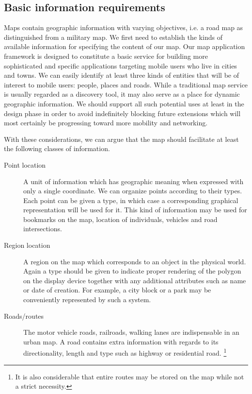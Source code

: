 \documentclass[a4paper,10pt]{article}
\begin{document}
\subsection{Basic information requirements}

Maps contain geographic information with varying objectives, i.e. a road map
as distinguished from a military map. We first need to establish the kinds
of available information for specifying the content of our map. Our map
application framework is designed to constitute a basic service for building
more sophisticated and specific applications targeting mobile users who live
in cities and towns. We can easily identify at least three kinds of entities
that will be of interest to mobile users: people, places and roads.  While a
traditional map service is usually regarded as a discovery tool, it may also
serve as a place for dynamic geographic information. We should support all
such potential uses at least in the design phase in order to avoid
indefinitely blocking future extensions which will most certainly be
progressing toward more mobility and networking.

With these considerations, we can argue that the map should facilitate at
least the following classes of information.

\begin{description}
\item[Point location] A unit of information which has geographic meaning
  when expressed with only a single coordinate. We can organize points
  according to their types. Each point can be given a type, in which case a
  corresponding graphical representation will be used for it. This kind of
  information may be used for bookmarks on the map, location of individuals,
  vehicles and road intersections.
\item[Region location] A region on the map which corresponds to an object in
  the physical world. Again a type should be given to indicate proper
  rendering of the polygon on the display device together with any
  additional attributes such as name or date of creation. For example, a
  city block or a park may be conveniently represented by such a system.
\item[Roads/routes] The motor vehicle roads, railroads, walking lanes are
  indispensable in an urban map. A road contains extra information with
  regards to its directionality, length and type such as highway or
  residential road. \footnote{It is also considerable that entire routes may
    be stored on the map while not a strict necessity.}
\end{description}
\end{document}
